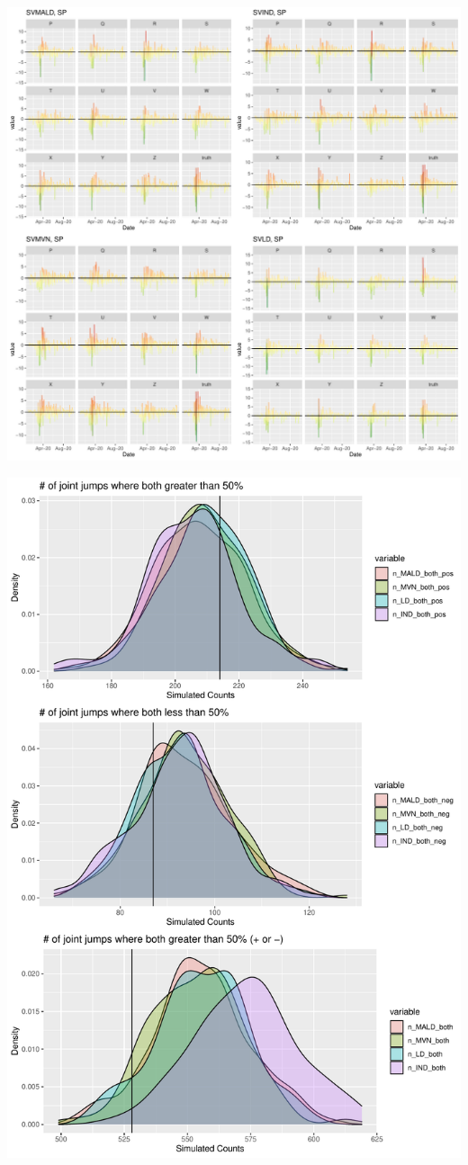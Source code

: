 \documentclass{article}\usepackage[]{graphicx}\usepackage[]{color}
\begin{document}
\newpage
\clearpage

\includegraphics[width = .9\linewidth]{"lineup_SP.pdf"}

\newpage
\clearpage

\includegraphics[width = .9\linewidth]{"ppp_joint_jumps.pdf"}
\end{document}
